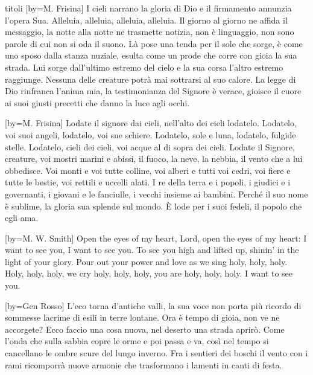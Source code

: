 \begin{songs}{titoli}
[by={M. Frisina}]
\beginchorus
I cieli narrano la gloria di Dio
e il firmamento annunzia l'opera Sua.
Alleluia, alleluia, alleluia, alleluia.
\endchorus
\beginverse
Il giorno al giorno ne affida il messaggio,
la notte alla notte ne trasmette notizia,
non è linguaggio, non sono parole
di cui non si oda il suono.
\endverse
\beginverse
Là pose una tenda per il sole che sorge,
è come uno sposo dalla stanza nuziale,
esulta come un prode che corre
con gioia la sua strada.
\endverse
\beginverse
Lui sorge dall'ultimo estremo del cielo
e la sua corsa l'altro estremo raggiunge.
Nessuna delle creature potrà
mai sottrarsi al suo calore.
\endverse
\beginverse
La legge di Dio rinfranca l'anima mia,
la testimonianza del Signore è verace,
gioisce il cuore ai suoi giusti precetti
che danno la luce agli occhi.
\endverse
\endsong

[by={M. Frisina}]
\beginchorus
Lodate il signore dai cieli, nell'alto dei cieli lodatelo.
Lodatelo, voi suoi angeli, lodatelo, voi sue schiere.
\endchorus
\beginverse
Lodatelo, sole e luna, lodatelo, fulgide stelle.
Lodatelo, cieli dei cieli, voi acque al di sopra dei cieli.
\endverse
\beginverse
Lodate il Signore, creature, voi mostri marini e abissi,
il fuoco, la neve, la nebbia, il vento che a lui obbedisce.
\endverse
\beginverse
Voi monti e voi tutte colline, voi alberi e tutti voi cedri,
voi fiere e tutte le bestie, voi rettili e uccelli alati.
\endverse
\beginverse
I re della terra e i popoli, i giudici e i governanti,
i giovani e le fanciulle, i vecchi insieme ai bambini.
\endverse
\beginverse
Perché il suo nome è sublime, la gloria sua splende sul mondo.
È lode per i suoi fedeli, il popolo che egli ama.
\endverse
\endsong

[by={M. W. Smith}]
\beginverse*
Open the eyes of my heart, Lord,
open the eyes of my heart:
I want to see you,
I want to see you.
\endverse
\beginverse*
To see you high and lifted up,
shinin' in the light of your glory.
Pour out your power and love
as we sing holy, holy, holy.
\endverse
\beginverse*
Holy, holy, holy,
we cry holy, holy, holy,
you are holy, holy, holy.
I want to see you.
\endverse
\endsong

[by={Gen Rosso}]
\beginverse
L'eco torna d'antiche valli, la sua voce non porta più
ricordo di sommesse lacrime di esili in terre lontane.
\endverse
\beginchorus
Ora è tempo di gioia, non ve ne accorgete?
Ecco faccio una cosa nuova,
nel deserto una strada aprirò.
\endchorus
\beginverse
Come l'onda che sulla sabbia copre le orme e poi passa e va,
così nel tempo si cancellano le ombre scure del lungo inverno.
\endverse
\beginverse
Fra i sentieri dei boschi il vento con i rami ricomporrà
nuove armonie che trasformano i lamenti in canti di festa.
\endverse
\endsong


\end{songs}
